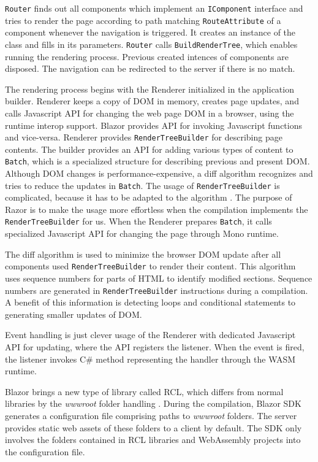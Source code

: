 \texttt{Router} finds out all components which implement an \texttt{IComponent} interface and tries to render the page according to path matching \texttt{RouteAttribute} of a component whenever the navigation is triggered.
It creates an instance of the class and fills in its parameters.
\texttt{Router} calls \texttt{BuildRenderTree}, which enables running the rendering process.
Previous created intences of components are disposed.
The navigation can be redirected to the server if there is no match.
\par
The rendering process begins with the Renderer initialized in the application builder.
Renderer keeps a copy of DOM in memory, creates page updates, and calls Javascript API for changing the web page DOM in a browser, using the runtime interop support.
Blazor provides API for invoking Javascript functions and vice-versa.
Renderer provides \texttt{RenderTreeBuilder} for describing page contents.
The builder provides an API for adding various types of content to \texttt{Batch}, which is a specialized structure for describing previous and present DOM.
Although DOM changes is performance-expensive, a diff algorithm \cite{online:diffAlgorithm} recognizes and tries to reduce the updates in \texttt{Batch}.
The usage of \texttt{RenderTreeBuilder} is complicated, because it has to be adapted to the algorithm \cite{online:renderTree}.
The purpose of Razor is to make the usage more effortless when the compilation implements the \texttt{RenderTreeBuilder} for us.
When the Renderer prepares \texttt{Batch}, it calls specialized Javascript API for changing the page through Mono runtime.
\par
The diff algorithm is used to minimize the browser DOM  update after all components used \texttt{RenderTreeBuilder} to render their content.
This algorithm uses sequence numbers for parts of HTML to identify modified sections.
Sequence numbers are generated in \texttt{RenderTreeBuilder} instructions during a compilation.
A benefit of this information is detecting loops and conditional statements to generating smaller updates of DOM.  
\par
Event handling is just clever usage of the Renderer with dedicated Javascript API for updating, where the API registers the listener.
When the event is fired, the listener invokes C\# method representing the handler through the WASM runtime.
\par
Blazor brings a new type of library called \ac{RCL}, which differs from normal libraries by the \textit{wwwroot} folder handling \cite{online:rcl}.
During the compilation, Blazor \ac{SDK} generates a configuration file comprising paths to \textit{wwwroot} folders.
The server provides static web assets of these folders to a client by default.
The SDK only involves the folders contained in RCL libraries and WebAssembly projects into the configuration file.

